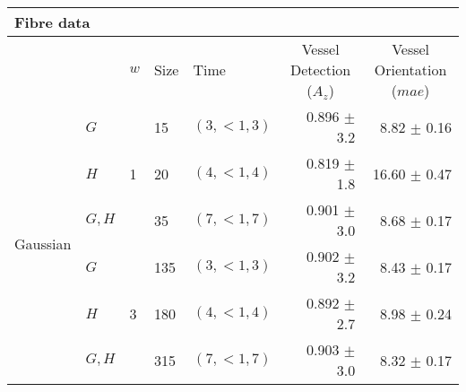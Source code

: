 \begin{tabularx}{\linewidth}{p{3cm} X X X X r r}
\toprule
\multicolumn{7}{l}{Fibre data} \\
\midrule
            &
            & $w$
            & Size
            & Time
            & \multicolumn{1}{c}{Vessel Detection \linebreak ($A_z$)}
            & \multicolumn{1}{c}{Vessel Orientation \linebreak ($mae$)}  \\

\midrule
\multirow{6}{3cm}{ Gaussian }
            & $G$                   & \multirow{3}{1cm}{ 1 }
                                    &      15 &$(3, {<}1, 3)$     & 0.896 $\pm$ 3.2 & 8.82 $\pm$ 0.16   \\
            & $H$                   &&     20 &$(4, {<}1, 4)$     & 0.819 $\pm$ 1.8 & 16.60 $\pm$ 0.47  \\
            & $G, H$                &&     35 &$(7, {<}1, 7)$     & 0.901 $\pm$ 3.0 & 8.68 $\pm$ 0.17   \\
            & $G$                   & \multirow{3}{1cm}{ 3 }
                                    &     135 &$(3, {<}1, 3)$      & 0.902 $\pm$ 3.2 & 8.43 $\pm$ 0.17 \\
            & $H$                   &&    180 &$(4, {<}1, 4)$      & 0.892 $\pm$ 2.7 & 8.98 $\pm$ 0.24 \\
            & $G, H$                &&    315 &$(7, {<}1, 7)$      & 0.903 $\pm$ 3.0 & 8.32 $\pm$ 0.17 \\


\end{tabularx}
